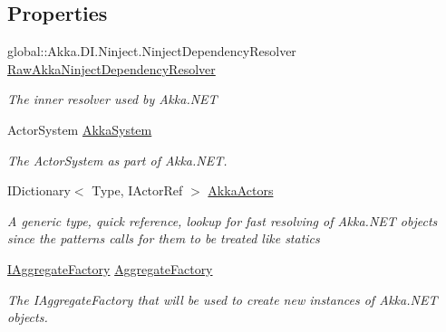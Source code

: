 \subsection*{Properties}
\begin{DoxyCompactItemize}
\item 
global\+::\+Akka.\+D\+I.\+Ninject.\+Ninject\+Dependency\+Resolver \hyperlink{classCqrs_1_1Ninject_1_1Akka_1_1AkkaNinjectDependencyResolver_a08c93ce2f3f66affd8753eb3d3de1211_a08c93ce2f3f66affd8753eb3d3de1211}{Raw\+Akka\+Ninject\+Dependency\+Resolver}
\begin{DoxyCompactList}\small\item\em The inner resolver used by Akka.\+N\+ET \end{DoxyCompactList}\item 
Actor\+System \hyperlink{classCqrs_1_1Ninject_1_1Akka_1_1AkkaNinjectDependencyResolver_a3de5415a68020e868579491453621f64_a3de5415a68020e868579491453621f64}{Akka\+System}
\begin{DoxyCompactList}\small\item\em The Actor\+System as part of Akka.\+N\+ET. \end{DoxyCompactList}\item 
I\+Dictionary$<$ Type, I\+Actor\+Ref $>$ \hyperlink{classCqrs_1_1Ninject_1_1Akka_1_1AkkaNinjectDependencyResolver_acfe6512df9f871fa148fbf0866b3ba52_acfe6512df9f871fa148fbf0866b3ba52}{Akka\+Actors}
\begin{DoxyCompactList}\small\item\em A generic type, quick reference, lookup for fast resolving of Akka.\+N\+ET objects since the patterns calls for them to be treated like statics \end{DoxyCompactList}\item 
\hyperlink{interfaceCqrs_1_1Domain_1_1Factories_1_1IAggregateFactory}{I\+Aggregate\+Factory} \hyperlink{classCqrs_1_1Ninject_1_1Akka_1_1AkkaNinjectDependencyResolver_afc2288a9aac598943df2a995b660d859_afc2288a9aac598943df2a995b660d859}{Aggregate\+Factory}
\begin{DoxyCompactList}\small\item\em The I\+Aggregate\+Factory that will be used to create new instances of Akka.\+N\+ET objects. \end{DoxyCompactList}\end{DoxyCompactItemize}
